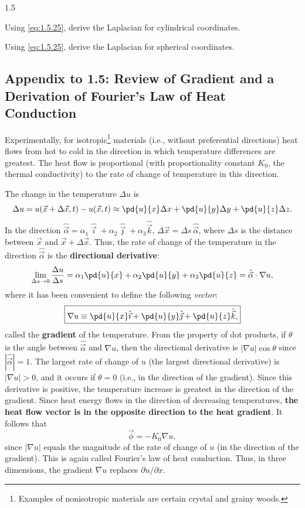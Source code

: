 \begin{exercises}{1.5}
\item Using \eqref{eq:1.5.25}, derive the Laplacian for cylindrical coordinates.

\item Using \eqref{eq:1.5.25}, derive the Laplacian for spherical coordinates.

\end{exercises}

\subsection*{Appendix to 1.5: Review of Gradient and a Derivation of Fourier's Law of Heat Conduction}

Experimentally, for isotropic\footnote{Examples of nonisotropic materials are certain crystal and grainy woods.} materials (i.e., without preferential directions) heat flows from hot to cold in the direction in which temperature differences are greatest. The heat flow is proportional (with proportionality constant $K_0$, the thermal conductivity) to the rate of change of temperature in this direction.

The change in the temperature $\Delta u$ is
\[
\Delta u = u(\vec{x} + \Delta\vec{x}, t) - u(\vec{x},t) \approx \pd{u}{x}\Delta x + \pd{u}{y}\Delta y + \pd{u}{z}\Delta z.
\]
In the direction $\hat{\vec{\alpha}} = \alpha_1\hat{\vec{\imath}} + \alpha_2\hat{\vec{\jmath}} + \alpha_3\hat{\vec{k}}$, $\Delta\vec{x} = \Delta s\,\hat{\vec{\alpha}}$, where $\Delta s$ is the distance between $\vec{x}$ and $\vec{x} + \Delta\vec{x}$. Thus, the rate of change of the temperature in the direction $\hat{\vec{\alpha}}$ is the \textbf{directional derivative}:
\[
\lim_{\Delta s \to 0}\frac{\Delta u}{\Delta s} = \alpha_1\pd{u}{x} + \alpha_2\pd{u}{y} + \alpha_3\pd{u}{z} = \hat{\vec{\alpha}}\cdot\nabla u,
\]
where it has been convenient to define the following \emph{vector}:
\begin{equation}
\boxed{\nabla u \equiv \pd{u}{x}\hat{\vec{\imath}} + \pd{u}{y}\hat{\vec{\jmath}} + \pd{u}{z}\hat{\vec{k}},}
\label{eq:1.5.26}
\end{equation}
called the \textbf{gradient} of the temperature. From the property of dot products, if $\theta$ is the angle between $\hat{\vec{\alpha}}$ and $\nabla u$, then the directional derivative is $|\nabla u|\cos\theta$ since $|\hat{\vec{\alpha}}| = 1$. The largest rate of change of $u$ (the largest directional derivative) is $|\nabla u| > 0$, and it occurs if $\theta = 0$ (i.e., in the direction of the gradient). Since this derivative is positive, the temperature increase is greatest in the direction of the gradient. Since heat energy flows in the direction of decreasing temperatures, \textbf{the heat flow vector is in the opposite direction to the heat gradient}. It follows that
\begin{equation}
\boxed{\vec{\phi} = -K_0 \nabla u,}
\label{eq:1.5.27}
\end{equation}
since $|\nabla u|$ equals the magnitude of the rate of change of $u$ (in the direction of the gradient). This is again called Fourier's law of heat conduction. Thus, in three dimensions, the gradient $\nabla u$ replaces $\partial u/\partial x$.

